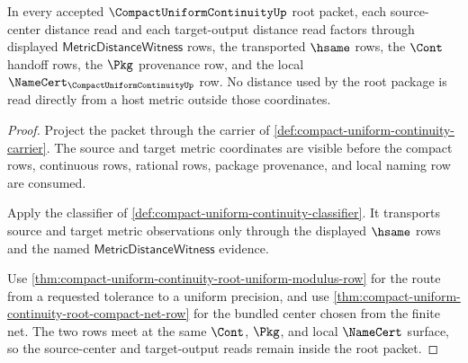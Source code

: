 \begin{theorem}
\label{thm:compact-uniform-continuity-root-metric-route}
In every accepted $\CompactUniformContinuityUp$ root packet, each source-center distance read and each target-output distance read factors through displayed $\mathsf{MetricDistanceWitness}$ rows, the transported $\hsame$ rows, the $\Cont$ handoff rows, the $\Pkg$ provenance row, and the local $\NameCert_{\CompactUniformContinuityUp}$ row. No distance used by the root package is read directly from a host metric outside those coordinates.
\end{theorem}
\begin{proof}
Project the packet through the carrier of \autoref{def:compact-uniform-continuity-carrier}. The source and target metric coordinates are visible before the compact rows, continuous rows, rational rows, package provenance, and local naming row are consumed.

Apply the classifier of \autoref{def:compact-uniform-continuity-classifier}. It transports source and target metric observations only through the displayed $\hsame$ rows and the named $\mathsf{MetricDistanceWitness}$ evidence.

Use \autoref{thm:compact-uniform-continuity-root-uniform-modulus-row} for the route from a requested tolerance to a uniform precision, and use \autoref{thm:compact-uniform-continuity-root-compact-net-row} for the bundled center chosen from the finite net. The two rows meet at the same $\Cont$, $\Pkg$, and local $\NameCert$ surface, so the source-center and target-output reads remain inside the root packet.
\end{proof}

